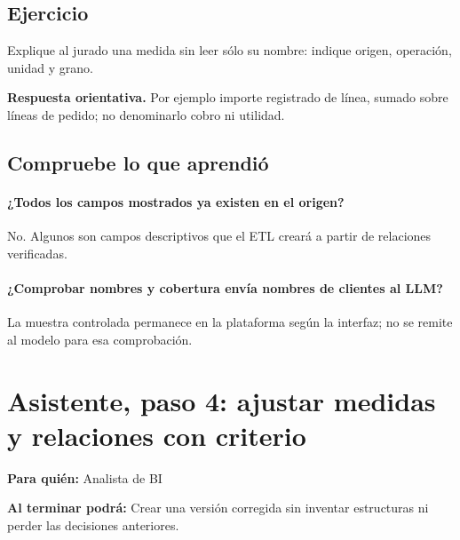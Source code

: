 \subsection{Ejercicio}
Explique al jurado una medida sin leer sólo su nombre: indique origen, operación, unidad y grano.

\textbf{Respuesta orientativa.} Por ejemplo importe registrado de línea, sumado sobre líneas de pedido; no denominarlo cobro ni utilidad.

\subsection{Compruebe lo que aprendió}
\paragraph{¿Todos los campos mostrados ya existen en el origen?} No. Algunos son campos descriptivos que el ETL creará a partir de relaciones verificadas.

\paragraph{¿Comprobar nombres y cobertura envía nombres de clientes al LLM?} La muestra controlada permanece en la plataforma según la interfaz; no se remite al modelo para esa comprobación.


\section{Asistente, paso 4: ajustar medidas y relaciones con criterio}
\label{unidad:BI06}
\textbf{Para quién:} Analista de BI\par
\textbf{Al terminar podrá:} Crear una versión corregida sin inventar estructuras ni perder las decisiones anteriores.

